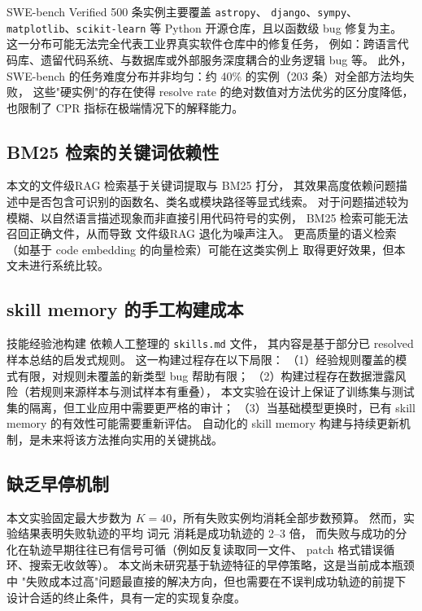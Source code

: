 SWE-bench Verified 500 条实例主要覆盖 \texttt{astropy}、
\texttt{django}、\texttt{sympy}、\texttt{matplotlib}、\texttt{scikit-learn}
等 Python 开源仓库，且以函数级 bug 修复为主。
这一分布可能无法完全代表工业界真实软件仓库中的修复任务，
例如：跨语言代码库、遗留代码系统、与数据库或外部服务深度耦合的业务逻辑 bug 等。
此外，SWE-bench 的任务难度分布并非均匀：约 40\% 的实例（203 条）对全部方法均失败，
这些"硬实例"的存在使得 resolve rate 的绝对数值对方法优劣的区分度降低，
也限制了 CPR 指标在极端情况下的解释能力。

\subsection{BM25 检索的关键词依赖性}
\label{subsec:limit-retrieval}

本文的文件级RAG 检索基于关键词提取与 BM25 打分，
其效果高度依赖问题描述中是否包含可识别的函数名、类名或模块路径等显式线索。
对于问题描述较为模糊、以自然语言描述现象而非直接引用代码符号的实例，
BM25 检索可能无法召回正确文件，从而导致 文件级RAG 退化为噪声注入。
更高质量的语义检索（如基于 code embedding 的向量检索）可能在这类实例上
取得更好效果，但本文未进行系统比较。

\subsection{skill memory 的手工构建成本}
\label{subsec:limit-skill}

技能经验池构建 依赖人工整理的 \texttt{skills.md} 文件，
其内容是基于部分已 resolved 样本总结的启发式规则。
这一构建过程存在以下局限：
（1）经验规则覆盖的模式有限，对规则未覆盖的新类型 bug 帮助有限；
（2）构建过程存在数据泄露风险（若规则来源样本与测试样本有重叠），
本文实验在设计上保证了训练集与测试集的隔离，但工业应用中需要更严格的审计；
（3）当基础模型更换时，已有 skill memory 的有效性可能需要重新评估。
自动化的 skill memory 构建与持续更新机制，是未来将该方法推向实用的关键挑战。

\subsection{缺乏早停机制}
\label{subsec:limit-earlystop}

本文实验固定最大步数为 $K=40$，所有失败实例均消耗全部步数预算。
然而，实验结果表明失败轨迹的平均 词元 消耗是成功轨迹的 2--3 倍，
而失败与成功的分化在轨迹早期往往已有信号可循（例如反复读取同一文件、
patch 格式错误循环、搜索无收敛等）。
本文尚未研究基于轨迹特征的早停策略，这是当前成本瓶颈中
"失败成本过高"问题最直接的解决方向，但也需要在不误判成功轨迹的前提下
设计合适的终止条件，具有一定的实现复杂度。


